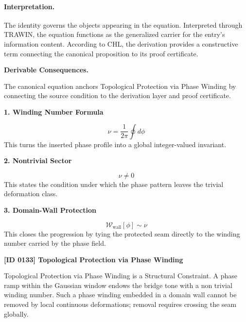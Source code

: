 \paragraph{Interpretation.}
The identity governs the objects appearing in the equation. Interpreted through TRAWIN, the equation functions as the generalized carrier for the entry’s information content. According to CHL, the derivation provides a constructive term connecting the canonical proposition to its proof certificate.

\par\vspace{0.35em}
\noindent\textbf{Derivable Consequences.}\quad
\begingroup
\footnotesize
\raggedright
The canonical equation anchors Topological Protection via Phase Winding by connecting the source condition to the derivation layer and proof certificate.
\par\endgroup

\noindent\textbf{1. Winding Number Formula}\par
\[
\nu=\frac{1}{2\pi}\oint d\phi
\]
\noindent This turns the inserted phase profile into a global integer-valued invariant.\par
\noindent\textbf{2. Nontrivial Sector}\par
\[
\nu\neq 0
\]
\noindent This states the condition under which the phase pattern leaves the trivial deformation class.\par
\noindent\textbf{3. Domain-Wall Protection}\par
\[
\mathcal{W}_{\mathrm{wall}}[\phi]\sim \nu
\]
\noindent This closes the progression by tying the protected seam directly to the winding number carried by the phase field.\par

\clearpage
\noindent\textbf{[ID 0133] Topological Protection via Phase Winding}\par
\vspace{0.35em}
\begingroup\small
{}
Topological Protection via Phase Winding is a Structural Constraint. A phase ramp within the Gaussian window endows the bridge tone with a non trivial winding number. Such a phase winding embedded in a domain wall cannot be removed by local continuous deformations; removal requires crossing the seam globally.

